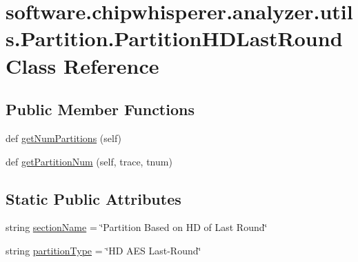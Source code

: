 \hypertarget{classsoftware_1_1chipwhisperer_1_1analyzer_1_1utils_1_1Partition_1_1PartitionHDLastRound}{}\section{software.\+chipwhisperer.\+analyzer.\+utils.\+Partition.\+Partition\+H\+D\+Last\+Round Class Reference}
\label{classsoftware_1_1chipwhisperer_1_1analyzer_1_1utils_1_1Partition_1_1PartitionHDLastRound}
\subsection*{Public Member Functions}
\begin{DoxyCompactItemize}
\item 
def \hyperlink{classsoftware_1_1chipwhisperer_1_1analyzer_1_1utils_1_1Partition_1_1PartitionHDLastRound_a5d4e8e1fb57049446f4c62dba08f6eaa}{get\+Num\+Partitions} (self)
\item 
def \hyperlink{classsoftware_1_1chipwhisperer_1_1analyzer_1_1utils_1_1Partition_1_1PartitionHDLastRound_a425b9b2390ba878dd1c8dfd65897be57}{get\+Partition\+Num} (self, trace, tnum)
\end{DoxyCompactItemize}
\subsection*{Static Public Attributes}
\begin{DoxyCompactItemize}
\item 
string \hyperlink{classsoftware_1_1chipwhisperer_1_1analyzer_1_1utils_1_1Partition_1_1PartitionHDLastRound_a5cf7c20f9ff03f5d82b31be65e77f7e2}{section\+Name} = \char`\"{}Partition Based on H\+D of Last Round\char`\"{}
\item 
string \hyperlink{classsoftware_1_1chipwhisperer_1_1analyzer_1_1utils_1_1Partition_1_1PartitionHDLastRound_ae335e15aa1d255853295367496c7d664}{partition\+Type} = \char`\"{}H\+D A\+E\+S Last-\/Round\char`\"{}
\end{DoxyCompactItemize}


